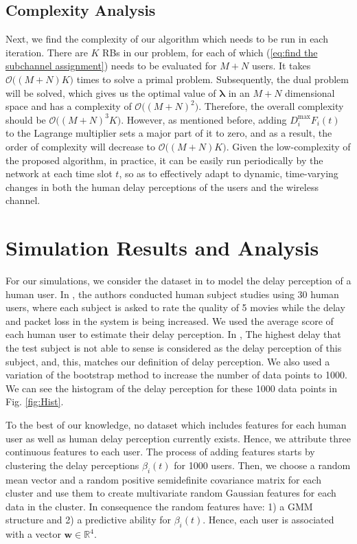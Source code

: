 \documentclass[journal,draftclsnofoot,onecolumn,12pt]{IEEEtran}%
\newcommand{\lambdab}{\boldsymbol{\lambda}}
\newcommand{\wb}{\boldsymbol{w}}
\begin{document}
\subsection{Complexity Analysis}
Next, we find the complexity of our algorithm which needs to be run in each iteration. There are $K$ RBs in our problem, for each of which (\ref{eq:find the subchannel assignment}) needs to be evaluated for $M+N$ users. It takes $\mathcal{O}\big((M+N)K\big)$ times to solve a primal problem.  Subsequently, the dual problem will be solved,  which gives us the optimal value of $\lambdab$ in an $M+N$ dimensional space and has a complexity of $\mathcal{O}\big((M+N)^2\big)$. Therefore, the overall complexity should be $\mathcal{O}\big((M+N)^3K\big)$. However, as mentioned before, adding $D_i^{\max}F_i(t)$ to the Lagrange multiplier sets a major part of it to zero, and as a result, the order of complexity will decrease to $\mathcal{O}\big((M+N)K\big)$. 
Given the low-complexity of the proposed algorithm, in practice, it can be easily run periodically by the network at each time slot $t$, so as to effectively adapt to dynamic, time-varying changes in both the human delay perceptions of the users and the wireless channel.

	
	\section{Simulation Results and Analysis}\label{sec:Simul}
	For our simulations, we consider the dataset in \cite{yang2015prospect} to model the delay perception of a human user. In \cite{yang2015prospect}, the authors conducted human subject studies using 30 human users, where each subject is asked to rate the quality of 5 movies while the delay and packet loss in the system is being increased. We used the average score of each human user to estimate their delay perception. {In \cite{yang2015prospect}, The highest delay that the test subject is not able to sense is considered as the delay perception of this subject, and, this, matches our definition of delay perception.} We also used a variation of the bootstrap method \cite{friedman2001elements} to increase the number of data points to 1000. We can see the histogram of the delay perception for these 1000 data points in Fig. \ref{fig:Hist}.

    
    
    
    
{To the best of our knowledge, no dataset which includes features for each human user as well as human delay perception currently exists. Hence, we attribute three continuous features to each user. The process of adding features starts by clustering the delay perceptions $\beta_i(t)$ for 1000 users. Then, we choose a random mean vector and a random positive semidefinite covariance matrix for each cluster and use them to create multivariate random Gaussian features for each data in the cluster. In consequence the random features have: 1) a GMM structure and 2) a predictive ability for $\beta_i(t)$.} Hence, each user is associated with a vector $\wb \in \mathds{R}^4$.
\end{document}
